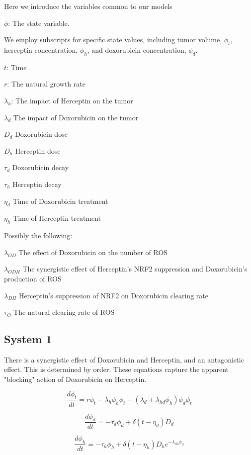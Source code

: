 \documentclass{article}
\begin{document}
Here we introduce the variables common to our models




$\phi$: The state variable.

We employ subscripts for specific state values, including tumor volume, $\phi_t$, herceptin concentration, $\phi_h$, and doxorubicin concentration, $\phi_d$.

$ t $: Time

$ r $: The natural growth rate

$ \lambda_h $: The impact of Herceptin on the tumor

$ \lambda_d $ The impact of Doxorubicin on the tumor

$ D_{d} $ Doxorubicin dose

$ D_{h} $ Herceptin dose

$ \tau_{d} $ Doxorubicin decay

$ \tau_{h} $ Herceptin decay

$ \eta_{d} $ Time of Doxorubicin treatment

$ \eta_{h} $ Time of Herceptin treatment



Possibly the following:


$ \lambda_{OD} $ The effect of Doxorubicin on the number of ROS

$ \lambda_{ODH} $ The synergistic effect of Herceptin's NRF2 suppression and Doxorubicin's production of ROS

$ \lambda_{DH} $ Herceptin's suppression of NRF2 on Doxorubicin clearing rate 


$ \tau_O $ The natural clearing rate of ROS




\subsection{System 1}

There is a synergistic effect of Doxorubicin and Herceptin, and an antagonistic effect. This is determined by order. These equations capture the apparent "blocking" action of Doxorubicin on Herceptin.



$$ \frac{d \phi_t}{dt} = r \phi_t - \lambda_h \phi_h \phi_t  - (\lambda_d + \lambda_{hd} \phi_h ) \phi_d \phi_t $$

$$ \frac{d \phi_d}{dt} = - \tau_d \phi_d + \delta (t - \eta_d) D_d $$

$$ \frac{d \phi_h}{dt} = - \tau_h \phi_h + \delta (t - \eta_h) D_h e^{-\lambda_{dh} \phi_d} $$
\end{document}
